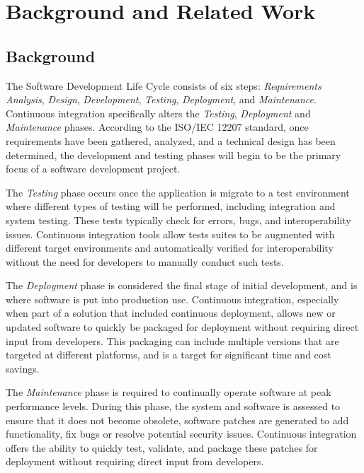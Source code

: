 \documentclass{sig-alternate}
\begin{document}
\section{Background and Related Work}

\subsection{Background}

The Software Development Life Cycle consists of six steps: \textit{Requirements Analysis}, \textit{Design}, \textit{Development}, \textit{Testing}, \textit{Deployment}, and \textit{Maintenance}. Continuous integration specifically alters the \textit{Testing}, \textit{Deployment} and \textit{Maintenance} phases. According to the ISO/IEC 12207 standard\cite{singh:lifecycle}, once requirements have been gathered, analyzed, and a technical design has been determined, the development and testing phases will begin to be the primary focus of a software development project.

The \textit{Testing} phase occurs once the application is migrate to a test environment where different types of testing will be performed, including integration and system testing. These tests typically check for errors, bugs, and interoperability issues. Continuous integration tools allow tests suites to be augmented with different target environments and automatically verified for interoperability without the need for developers to manually conduct such tests.

The \textit{Deployment} phase is considered the final stage of initial development, and is where software is put into production use. Continuous integration, especially when part of a solution that included continuous deployment, allows new or updated software to quickly be packaged for deployment without requiring direct input from developers. This packaging can include multiple versions that are targeted at different platforms, and is a target for significant time and cost savings.

The \textit{Maintenance} phase is required to continually operate software at peak performance levels. During this phase, the system and software is assessed to ensure that it does not become obsolete, software patches are generated to add functionality, fix bugs or resolve potential security issues. Continuous integration offers the ability to quickly test, validate, and package these patches for deployment without requiring direct input from developers.
\end{document}
